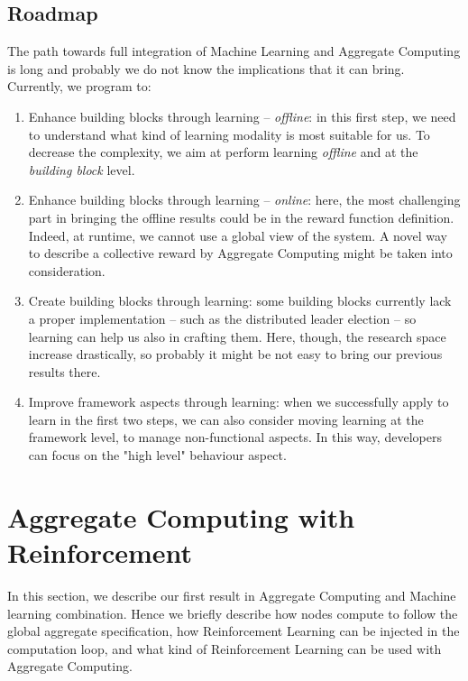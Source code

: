\documentclass[
  twocolumn,
]{ceurart}
\begin{document}

\subsection{Roadmap}
The path towards full integration of Machine Learning and Aggregate Computing is long and probably we do not know the implications that it can bring. 
Currently, we program to:
\begin{enumerate}
  \item Enhance building blocks through learning -- \textit{offline}: 
  in this first step, we need to understand what kind of learning modality is most suitable for us. 
  To decrease the complexity, we aim at perform learning \textit{offline} and at the \textit{building block} level.
  \item Enhance building blocks through learning -- \textit{online}:
  here, the most challenging part in bringing the offline results could be in the reward function definition.
  Indeed, at runtime, we cannot use a global view of the system. 
  A novel way to describe a collective reward by Aggregate Computing might be taken into consideration.
  \item Create building blocks through learning: some building blocks currently lack a proper implementation -- 
  such as the distributed leader election -- so learning can help us also in crafting them. 
  Here, though, the research space increase drastically, 
  so probably it might be not easy to bring our previous results there.
  \item Improve framework aspects through learning: 
  when we successfully apply to learn in the first two steps, 
  we can also consider moving learning at the framework level, to manage non-functional aspects. 
  In this way, developers can focus on the "high level" behaviour aspect.
\end{enumerate}

\section{Aggregate Computing with Reinforcement}
In this section, we describe our first result in Aggregate Computing and Machine learning combination.
% 
Hence we briefly describe how nodes compute to follow the global aggregate specification,
 how Reinforcement Learning can be injected in the computation loop,
 and what kind of Reinforcement Learning can be used with Aggregate Computing.
\end{document}
